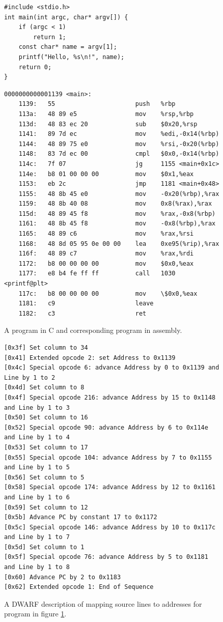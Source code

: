 \begin{figure}
    \begin{verbatim}
#include <stdio.h>
int main(int argc, char* argv[]) {
    if (argc < 1)
        return 1;
    const char* name = argv[1];
    printf("Hello, %s\n!", name);
    return 0;
}
    \end{verbatim}
    \begin{lstlisting}
0000000000001139 <main>:
    1139:	55                   	push   %rbp
    113a:	48 89 e5             	mov    %rsp,%rbp
    113d:	48 83 ec 20          	sub    $0x20,%rsp
    1141:	89 7d ec             	mov    %edi,-0x14(%rbp)
    1144:	48 89 75 e0          	mov    %rsi,-0x20(%rbp)
    1148:	83 7d ec 00          	cmpl   $0x0,-0x14(%rbp)
    114c:	7f 07                	jg     1155 <main+0x1c>
    114e:	b8 01 00 00 00       	mov    $0x1,%eax
    1153:	eb 2c                	jmp    1181 <main+0x48>
    1155:	48 8b 45 e0          	mov    -0x20(%rbp),%rax
    1159:	48 8b 40 08          	mov    0x8(%rax),%rax
    115d:	48 89 45 f8          	mov    %rax,-0x8(%rbp)
    1161:	48 8b 45 f8          	mov    -0x8(%rbp),%rax
    1165:	48 89 c6             	mov    %rax,%rsi
    1168:	48 8d 05 95 0e 00 00 	lea    0xe95(%rip),%rax
    116f:	48 89 c7             	mov    %rax,%rdi
    1172:	b8 00 00 00 00       	mov    $0x0,%eax
    1177:	e8 b4 fe ff ff       	call   1030 <printf@plt>
    117c:	b8 00 00 00 00       	mov    \$0x0,%eax
    1181:	c9                   	leave
    1182:	c3                   	ret
    \end{lstlisting}
    \caption{A program in C and corresponding program in assembly.}
    \label{fig:c-program-and-its-assembly}
\end{figure}

\begin{figure}
    \begin{lstlisting}
[0x3f] Set column to 34
[0x41] Extended opcode 2: set Address to 0x1139
[0x4c] Special opcode 6: advance Address by 0 to 0x1139 and Line by 1 to 2
[0x4d] Set column to 8
[0x4f] Special opcode 216: advance Address by 15 to 0x1148 and Line by 1 to 3
[0x50] Set column to 16
[0x52] Special opcode 90: advance Address by 6 to 0x114e and Line by 1 to 4
[0x53] Set column to 17
[0x55] Special opcode 104: advance Address by 7 to 0x1155 and Line by 1 to 5
[0x56] Set column to 5
[0x58] Special opcode 174: advance Address by 12 to 0x1161 and Line by 1 to 6
[0x59] Set column to 12
[0x5b] Advance PC by constant 17 to 0x1172
[0x5c] Special opcode 146: advance Address by 10 to 0x117c and Line by 1 to 7
[0x5d] Set column to 1
[0x5f] Special opcode 76: advance Address by 5 to 0x1181 and Line by 1 to 8
[0x60] Advance PC by 2 to 0x1183
[0x62] Extended opcode 1: End of Sequence
    \end{lstlisting}
    \caption{A DWARF description of mapping source lines to addresses for
    program in figure \ref{fig:c-program-and-its-assembly}.}
    \label{fig:dwarf-locations}
\end{figure}


